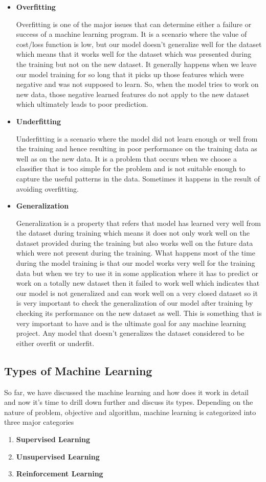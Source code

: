 \begin{itemize}
  \item  \textbf{Overfitting}
  \par
  Overfitting is one of the major issues that can determine either a failure or success of a machine learning program. It is a scenario where the value of cost/loss function is low, but our model doesn't generalize well for the dataset which means that it works well for the dataset which was presented during the training but not on the new dataset. It generally happens when we leave our model training for so long that it picks up those features which were negative and was not supposed to learn. So, when the model tries to work on new data, those negative learned features do not apply to the new dataset which ultimately leads to poor prediction.
  \item  \textbf{Underfitting}
  \par
  Underfitting is a scenario where the model did not learn enough or well from the training and hence resulting in poor performance on the training data as well as on the new data. It is a problem that occurs when we choose a classifier that is too simple for the problem and is not suitable enough to capture the useful patterns in the data. Sometimes it happens in the result of avoiding overfitting.
  \item  \textbf{Generalization}
  \par
  Generalization is a property that refers that model has learned very well from the dataset during training which means it does not only work well on the dataset provided during the training but also works well on the future data which were not present during the training. What happens most of the time during the model training is that our model works very well for the training data but when we try to use it in some application where it has to predict or work on a totally new dataset then it failed to work well which indicates that our model is not generalized and can work well on a very closed dataset so it is very important to check the generalization of our model after training by checking its performance on the new dataset as well. This is something that is very important to have and is the ultimate goal for any machine learning project. Any model that doesn't generalizes the dataset considered to be either overfit or underfit.
\end{itemize}
\subsection{Types of Machine Learning}
So far, we have discussed the machine learning and how does it work in detail and now it's time to drill down further and discuss its types. Depending on the nature of problem, objective and algorithm, machine learning is categorized into three major categories
\begin{enumerate}
    \item \textbf{Supervised Learning}
    \item \textbf{Unsupervised Learning}
    \item \textbf{Reinforcement Learning}
\end{enumerate}
